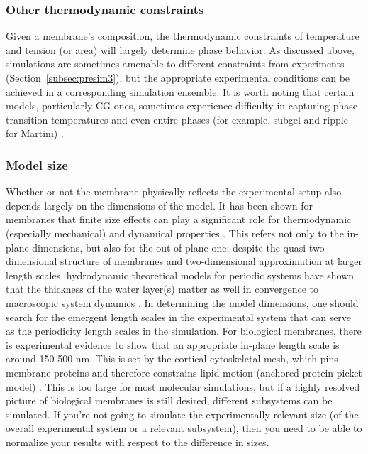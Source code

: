 \documentclass[9pt,bestpractices]{livecoms}
\begin{document}
\subsubsection{Other thermodynamic constraints}
\label{subsubsec:constraints}
Given a membrane's composition, the thermodynamic constraints of temperature and tension (or area) will largely determine phase behavior.
As discussed above, simulations are sometimes amenable to different constraints from experiments (Section~\ref{subsec:presim3}), but the appropriate experimental conditions can be achieved in a corresponding simulation ensemble.
It is worth noting that certain models, particularly CG ones, sometimes experience difficulty in capturing phase transition temperatures and even entire phases (for example, subgel and ripple for Martini) \cite{Rodgers2012}.

\subsubsection{Model size}
\label{subsubsec:size}
Whether or not the membrane physically reflects the experimental setup also depends largely on the dimensions of the model.
It has been shown for membranes that finite size effects can play a significant role for thermodynamic (especially mechanical) and dynamical properties \cite{Castro-Roman2006,Waheed2009,Venable2015,Venable2017}.
This refers not only to the in-plane dimensions, but also for the out-of-plane one; despite the quasi-two-dimensional structure of membranes and two-dimensional approximation at larger length scales, hydrodynamic theoretical models for periodic systems have shown that the thickness of the water layer(s) matter as well in convergence to macroscopic system dynamics \cite{Venable2017}.
In determining the model dimensions, one should search for the emergent length scales in the experimental system that can serve as the periodicity length scales in the simulation.
For biological membranes, there is experimental evidence to show that an appropriate in-plane length scale is around 150-500 nm.
This is set by the cortical cytoskeletal mesh, which pins membrane proteins and therefore constrains lipid motion (anchored protein picket model) \cite{Ritchie2003,Morone2006}.
This is too large for most molecular simulations, but if a highly resolved picture of biological membranes is still desired, different subsystems can be simulated.
If you're not going to simulate the experimentally relevant size (of the overall experimental system or a relevant subsystem), then you need to be able to normalize your results with respect to the difference in sizes.
\end{document}
